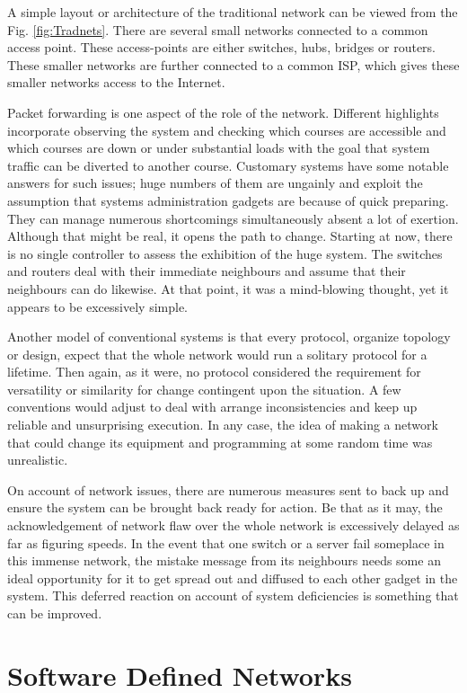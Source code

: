     A simple layout or architecture of the traditional network can be viewed from the Fig. \ref{fig:Tradnets}. There are several small networks connected to a common access point. These access-points are either switches, hubs, bridges or routers. These smaller networks are further connected to a common ISP, which gives these smaller networks access to the Internet.
    
   Packet forwarding is one aspect of the role of the network. Different highlights incorporate observing the system and checking which courses are accessible and which courses are down or under substantial loads with the goal that system traffic can be diverted to another course. Customary systems have some notable answers for such issues; huge numbers of them are ungainly and exploit the assumption that systems administration gadgets are because of quick preparing. They can manage numerous shortcomings simultaneously absent a lot of exertion. Although that might be real, it opens the path to change. Starting at now, there is no single controller to assess the exhibition of the huge system. The switches and routers deal with their immediate neighbours and assume that their neighbours can do likewise. At that point, it was a mind-blowing thought, yet it appears to be excessively simple.
        
    Another model of conventional systems is that every protocol, organize topology or design, expect that the whole network would run a solitary protocol for a lifetime. Then again, as it were, no protocol considered the requirement for versatility or similarity for change contingent upon the situation. A few conventions would adjust to deal with arrange inconsistencies and keep up reliable and unsurprising execution. In any case, the idea of making a network that could change its equipment and programming at some random time was unrealistic.
    
     On account of network issues, there are numerous measures sent to back up and ensure the system can be brought back ready for action. Be that as it may, the acknowledgement of network flaw over the whole network is excessively delayed as far as figuring speeds. In the event that one switch or a server fail someplace in this immense network, the mistake message from its neighbours needs some an ideal opportunity for it to get spread out and diffused to each other gadget in the system. This deferred reaction on account of system deficiencies is something that can be improved.
     
\section{Software Defined Networks}
    
